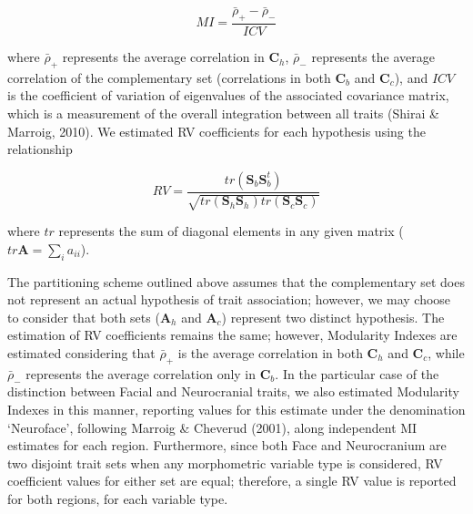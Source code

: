 \documentclass[12pt,twoside]{report}
\begin{document}
\begin{equation}
MI = \frac {\bar{\rho}_{+} - \bar{\rho}_{-}} {ICV}
\label{eq:mi}
\end{equation}

where $\bar{\rho}_{+}$ represents the average correlation in
$\mathbf{C}_h$, $\bar{\rho}_{-}$ represents the average correlation of
the complementary set (correlations in both $\mathbf{C}_b$ and
$\mathbf{C}_c$), and $ICV$ is the coefficient of variation of
eigenvalues of the associated covariance matrix, which is a measurement
of the overall integration between all traits (Shirai \& Marroig, 2010).
We estimated RV coefficients for each hypothesis using the relationship

\begin{equation}
RV = \frac{tr(\mathbf{S}_{b}\mathbf{S}^t_{b})}{\sqrt{tr(\mathbf{S}_h \mathbf{S}_h)tr(\mathbf{S}_c \mathbf{S}_c)}}
\label{eq:rv}
\end{equation}

where $tr$ represents the sum of diagonal elements in any given matrix
($tr \mathbf{A} = \sum_i a_{ii}$).

The partitioning scheme outlined above assumes that the complementary
set does not represent an actual hypothesis of trait association;
however, we may choose to consider that both sets ($\mathbf{A}_h$ and
$\mathbf{A}_c$) represent two distinct hypothesis. The estimation of RV
coefficients remains the same; however, Modularity Indexes are estimated
considering that $\bar{\rho}_{+}$ is the average correlation in both
$\mathbf{C}_h$ and $\mathbf{C}_c$, while $\bar{\rho}_{-}$ represents the
average correlation only in $\mathbf{C}_b$. In the particular case of
the distinction between Facial and Neurocranial traits, we also
estimated Modularity Indexes in this manner, reporting values for this
estimate under the denomination `Neuroface', following Marroig \&
Cheverud (2001), along independent MI estimates for each region.
Furthermore, since both Face and Neurocranium are two disjoint trait
sets when any morphometric variable type is considered, RV coefficient
values for either set are equal; therefore, a single RV value is
reported for both regions, for each variable type.
\end{document}
